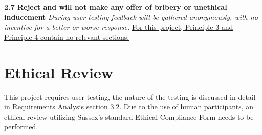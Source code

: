 \documentclass{report}
\begin{document}
\begin{raggedright}
\newline
\newline
\textbf{2.7 Reject and will not make any offer of bribery or unethical inducement}
\newline
\newline
\textit{During user testing feedback will be gathered anonymously, with no incentive for a better or worse response.}
\newline
\newline
\underline{For this project, Principle 3 and Principle 4 contain no relevant sections.}
\end{raggedright}

\section{Ethical Review}

This project requires user testing, the nature of the testing is discussed in detail in Requirements Analysis section 3.2.
Due to the use of human participants, an ethical review utilizing Sussex's standard Ethical Compliance Form needs to be performed.
\end{document}
